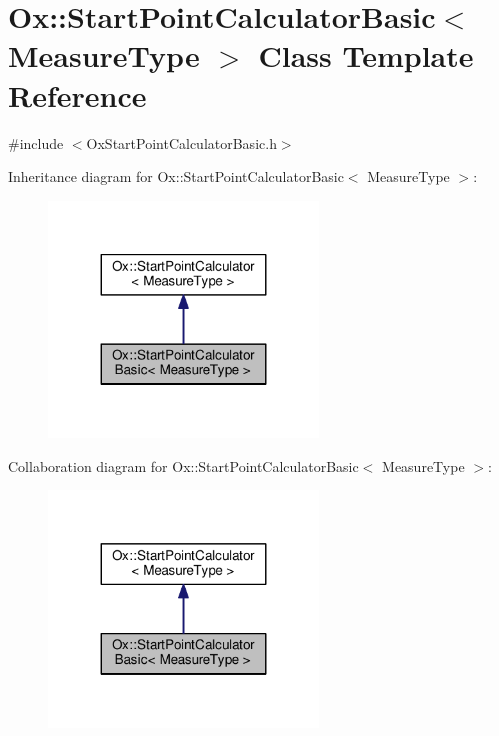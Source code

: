 \hypertarget{class_ox_1_1_start_point_calculator_basic}{}\section{Ox\+:\+:Start\+Point\+Calculator\+Basic$<$ Measure\+Type $>$ Class Template Reference}
\label{class_ox_1_1_start_point_calculator_basic}


{\ttfamily \#include $<$Ox\+Start\+Point\+Calculator\+Basic.\+h$>$}



Inheritance diagram for Ox\+:\+:Start\+Point\+Calculator\+Basic$<$ Measure\+Type $>$\+:
\nopagebreak
\begin{figure}[H]
\begin{center}
\leavevmode
\includegraphics[width=203pt]{class_ox_1_1_start_point_calculator_basic__inherit__graph}
\end{center}
\end{figure}


Collaboration diagram for Ox\+:\+:Start\+Point\+Calculator\+Basic$<$ Measure\+Type $>$\+:
\nopagebreak
\begin{figure}[H]
\begin{center}
\leavevmode
\includegraphics[width=203pt]{class_ox_1_1_start_point_calculator_basic__coll__graph}
\end{center}
\end{figure}
